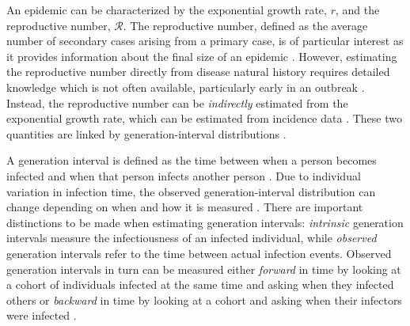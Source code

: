 \documentclass[12pt]{article}
\newcommand{\RR}{\ensuremath{{\mathcal R}}}
\begin{document}
An epidemic can be characterized by the exponential growth rate, $r$, and the reproductive number, \RR.
The reproductive number, defined as the average number of secondary cases arising from a primary case, is of particular interest as it provides information about the final size of an epidemic \citep{anderson1991infectious, diekmann1990definition}.
However, estimating the reproductive number directly from disease natural history requires detailed knowledge which is not often available, particularly early in an outbreak \citep{dietz1993estimation}.
Instead, the reproductive number can be \emph{indirectly} estimated from the exponential growth rate, which can be estimated from incidence data \citep{chowell2003sars, mills2004transmissibility, nishiura2009transmission, nishiura2010pros, ma2014estimating}.
These two quantities are linked by generation-interval distributions \citep{wearing2005appropriate, svensson2007note, roberts2007model, wallinga2007generation, park2019practical}.

A generation interval is defined as the time between when a person becomes infected and when that person infects another person \citep{svensson2007note}.
Due to individual variation in infection time, the observed generation-interval distribution can change depending on when and how it is measured \citep{svensson2007note, kenah2008generation, nishiura2010time, champredon2015intrinsic}.
There are important distinctions to be made when estimating generation intervals: \emph{intrinsic} generation intervals measure the infectiousness of an infected individual,
while \emph{observed} generation intervals refer to the time between actual infection events.
Observed generation intervals in turn can be measured either \emph{forward} in time by looking at a cohort of individuals infected at the same time and asking when they infected others or \emph{backward} in time by looking at a cohort and asking when their infectors were infected \citep{champredon2015intrinsic}.
\end{document}
